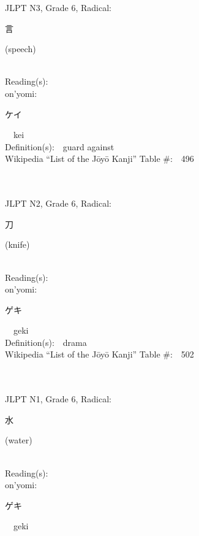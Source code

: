 \begin{multicols}{2}
{JLPT N3, Grade 6, Radical:\ \ {\begin{CJK}{UTF8}{min} 言 \end{CJK}} (speech) } \\
Reading(s):\ \ \\
{\hspace*{1em}}on'yomi:\ \ \\
{\hspace*{2em}}{\begin{CJK}{UTF8}{min} ケイ \end{CJK}}\ \ kei\ \ \\
Definition(s):\ \ guard against \\
Wikipedia ``List of the J\=oy\=o Kanji'' Table \#:\ \ 496 \\
\ \ \\
{\fontsize{34pt}{40pt}  }\ \ \\  %
{JLPT N2, Grade 6, Radical:\ \ {\begin{CJK}{UTF8}{min} 刀 \end{CJK}} (knife) } \\
Reading(s):\ \ \\
{\hspace*{1em}}on'yomi:\ \ \\
{\hspace*{2em}}{\begin{CJK}{UTF8}{min} ゲキ \end{CJK}}\ \ geki\ \ \\
Definition(s):\ \ drama \\
Wikipedia ``List of the J\=oy\=o Kanji'' Table \#:\ \ 502 \\
\ \ \\
{\fontsize{34pt}{40pt}  }\ \ \\  %
{JLPT N1, Grade 6, Radical:\ \ {\begin{CJK}{UTF8}{min} 水 \end{CJK}} (water) } \\
Reading(s):\ \ \\
{\hspace*{1em}}on'yomi:\ \ \\
{\hspace*{2em}}{\begin{CJK}{UTF8}{min} ゲキ \end{CJK}}\ \ geki\ \ \\

\end{multicols}
